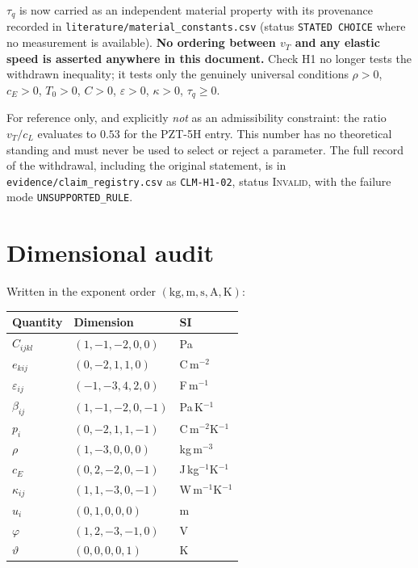 \documentclass[11pt]{article}
\newcommand{\eps}{\varepsilon}
\newcommand{\bth}{\vartheta}
\theoremstyle{plain}
\begin{document}
$\tau_q$ is now carried as an independent material property with its provenance
recorded in \texttt{literature/material\_constants.csv} (status
\texttt{STATED CHOICE} where no measurement is available). \textbf{No ordering
between $v_T$ and any elastic speed is asserted anywhere in this document.}
Check H1 no longer tests the withdrawn inequality; it tests only the genuinely
universal conditions $\rho>0$, $c_E>0$, $T_0>0$, $C>0$, $\eps>0$, $\kappa>0$,
$\tau_q\ge0$.

For reference only, and explicitly \emph{not} as an admissibility constraint:
the ratio $v_T/c_L$ evaluates to $0.53$ for the PZT-5H entry. This number has no
theoretical standing and must never be used to select or reject a parameter.
The full record of the withdrawal, including the original statement, is in
\texttt{evidence/claim\_registry.csv} as \texttt{CLM-H1-02}, status
\textsc{Invalid}, with the failure mode \texttt{UNSUPPORTED\_RULE}.

\section{Dimensional audit}
\label{sec:dims}

Written in the exponent order $(\mathrm{kg},\mathrm{m},\mathrm{s},\mathrm{A},\mathrm{K})$:
\begin{center}
\begin{tabular}{lll}
\toprule
Quantity & Dimension & SI \\
\midrule
$C_{ijkl}$ & $(1,-1,-2,0,0)$ & Pa \\
$e_{kij}$ & $(0,-2,1,1,0)$ & C\,m$^{-2}$ \\
$\eps_{ij}$ & $(-1,-3,4,2,0)$ & F\,m$^{-1}$ \\
$\beta_{ij}$ & $(1,-1,-2,0,-1)$ & Pa\,K$^{-1}$ \\
$p_i$ & $(0,-2,1,1,-1)$ & C\,m$^{-2}$K$^{-1}$ \\
$\rho$ & $(1,-3,0,0,0)$ & kg\,m$^{-3}$ \\
$c_E$ & $(0,2,-2,0,-1)$ & J\,kg$^{-1}$K$^{-1}$ \\
$\kappa_{ij}$ & $(1,1,-3,0,-1)$ & W\,m$^{-1}$K$^{-1}$ \\
$u_i$ & $(0,1,0,0,0)$ & m \\
$\varphi$ & $(1,2,-3,-1,0)$ & V \\
$\bth$ & $(0,0,0,0,1)$ & K \\
\bottomrule
\end{tabular}
\end{center}
\end{document}
